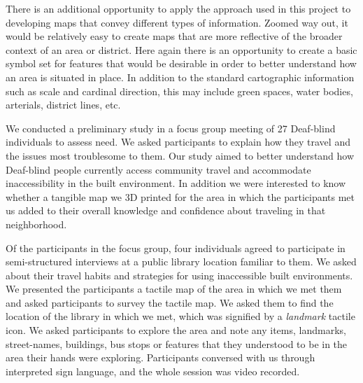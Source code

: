 There is an additional opportunity to apply the approach used in this project to developing maps that convey different types of information.  Zoomed way out, it would be relatively easy to create maps that are more reflective of the broader context of an area or district.  Here again there is an opportunity to create a basic symbol set for features that would be desirable in order to better understand how an area is situated in place.  In addition to the standard cartographic information such as scale and cardinal direction, this may include green spaces, water bodies, arterials, district lines, etc.  


We conducted a  preliminary study in a focus group meeting of 27 Deaf-blind individuals to assess need. We asked participants to explain how they travel and the issues most troublesome to them. 
Our study aimed to better understand how Deaf-blind people currently access community travel and 
accommodate inaccessibility in the built environment. In addition we were interested to know whether a tangible map we 3D printed for the area in which the participants met us added to their overall knowledge and confidence about traveling in that neighborhood.


Of the participants in the focus group, four individuals agreed to participate in semi-structured interviews at a public library location familiar to them. We asked about their travel habits and strategies for using inaccessible built environments.
We presented the participants a tactile map of the area in which we met them and asked participants to survey the tactile map. We asked them to find the location of the library in which we met, which was signified by a \textit{landmark} tactile icon.  We asked participants to explore the area and note any items, landmarks, street-names, buildings, bus stops or features that they understood to be in the area their hands were exploring. %
Participants conversed with us through  interpreted sign language, and the whole session was video recorded. %


